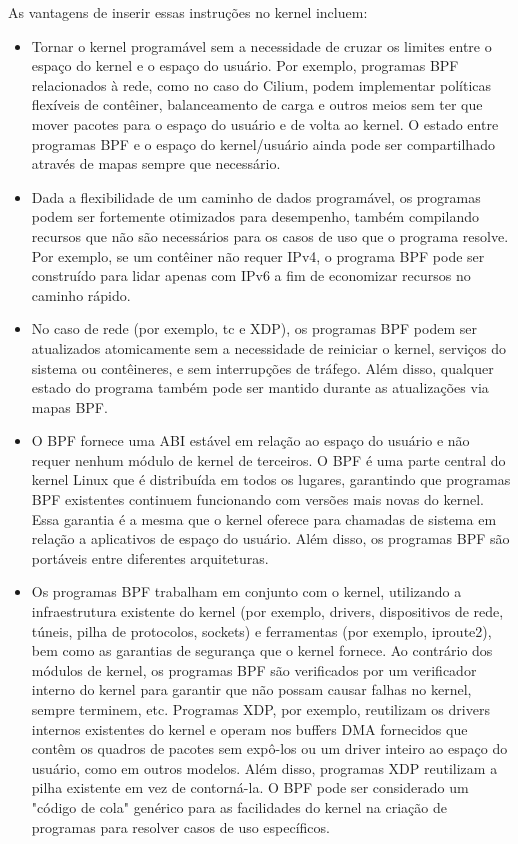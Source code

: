 \documentclass[sigconf]{acmart}
\begin{document}
As vantagens de inserir essas instruções no kernel incluem:
\begin{itemize}
\item Tornar o kernel programável sem a necessidade de cruzar os limites entre o espaço do kernel e o espaço do usuário. Por exemplo, programas BPF relacionados à rede, como no caso do Cilium, podem implementar políticas flexíveis de contêiner, balanceamento de carga e outros meios sem ter que mover pacotes para o espaço do usuário e de volta ao kernel. O estado entre programas BPF e o espaço do kernel/usuário ainda pode ser compartilhado através de mapas sempre que necessário.
\item Dada a flexibilidade de um caminho de dados programável, os programas podem ser fortemente otimizados para desempenho, também compilando recursos que não são necessários para os casos de uso que o programa resolve. Por exemplo, se um contêiner não requer IPv4, o programa BPF pode ser construído para lidar apenas com IPv6 a fim de economizar recursos no caminho rápido.
\item No caso de rede (por exemplo, tc e XDP), os programas BPF podem ser atualizados atomicamente sem a necessidade de reiniciar o kernel, serviços do sistema ou contêineres, e sem interrupções de tráfego. Além disso, qualquer estado do programa também pode ser mantido durante as atualizações via mapas BPF.
\item O BPF fornece uma ABI estável em relação ao espaço do usuário e não requer nenhum módulo de kernel de terceiros. O BPF é uma parte central do kernel Linux que é distribuída em todos os lugares, garantindo que programas BPF existentes continuem funcionando com versões mais novas do kernel. Essa garantia é a mesma que o kernel oferece para chamadas de sistema em relação a aplicativos de espaço do usuário. Além disso, os programas BPF são portáveis entre diferentes arquiteturas.
\item Os programas BPF trabalham em conjunto com o kernel, utilizando a infraestrutura existente do kernel (por exemplo, drivers, dispositivos de rede, túneis, pilha de protocolos, sockets) e ferramentas (por exemplo, iproute2), bem como as garantias de segurança que o kernel fornece. Ao contrário dos módulos de kernel, os programas BPF são verificados por um verificador interno do kernel para garantir que não possam causar falhas no kernel, sempre terminem, etc. Programas XDP, por exemplo, reutilizam os drivers internos existentes do kernel e operam nos buffers DMA fornecidos que contêm os quadros de pacotes sem expô-los ou um driver inteiro ao espaço do usuário, como em outros modelos. Além disso, programas XDP reutilizam a pilha existente em vez de contorná-la. O BPF pode ser considerado um "código de cola" genérico para as facilidades do kernel na criação de programas para resolver casos de uso específicos.

\end{itemize}
\end{document}
